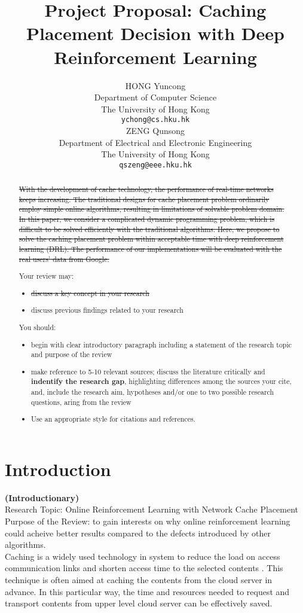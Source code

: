 \documentclass{article}
\title{Project Proposal: Caching Placement Decision with Deep Reinforcement Learning}
\author{
  HONG Yuncong \\ %
  Department of Computer Science \\
  The University of Hong Kong \\
  \texttt{ychong@cs.hku.hk} \\
  \And %
  ZENG Qunsong \\
  Department of Electrical and Electronic Engineering \\
  The University of Hong Kong \\
  \texttt{qszeng@eee.hku.hk} \\
}
\begin{document}
\maketitle

\begin{abstract}
  \st{With the development of cache technology, the performance of real-time networks keeps increasing. The traditional designs for cache placement problem ordinarily employ simple online algorithms, resulting in limitations of solvable problem domain. In this paper, we consider a complicated dynamic programming problem, which is difficult to be solved efficiently with the traditional algorithms. Here, we propose to solve the caching placement problem within acceptable time with deep reinforcement learning (DRL). The performance of our implementations will be evaluated with the real users' data from Google.}

  Your review may:
  \begin{itemize}
    \item \st{discuss a key concept in your research}
    \item discuss previous findings related to your research
  \end{itemize}

  You should:
  \begin{itemize}
    \item begin with clear introductory paragraph including a statement of the research topic and purpose of the review
    \item make reference to 5-10 relevant sources; discuss the literature critically and \textbf{indentify the research gap}, highlighting differences among the sources your cite, and, include the research aim, hypotheses and/or one to two possible research questions, aring from the review
    \item Use an appropriate style for citations and references.
  \end{itemize}
\end{abstract}

\section{Introduction}

  \textbf{(Introductionary)}\\
  Research Topic: Online Reinforcement Learning with Network Cache Placement \\
  Purpose of the Review: to gain interests on why online reinforcement learning could acheive better results compared to the defects introduced by other algorithms. \\
  Caching is a widely used technology in system to reduce the load on access communication links and shorten access time to the selected contents \cite{general-cache}. This technique is often aimed at caching the contents from the cloud server in advance. In this particular way, the time and resources needed to request and transport contents from upper level cloud server can be effectively saved. 
  
\end{document}
